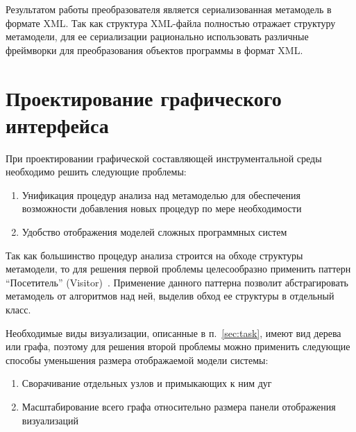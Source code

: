 Результатом работы преобразователя является сериализованная метамодель в формате
XML. Так как структура XML-файла полностью отражает структуру метамодели, для ее
сериализации рационально использовать различные фреймворки для преобразования
объектов программы в формат XML.

\section{Проектирование графического интерфейса}

При проектировании графической составляющей инструментальной среды необходимо
решить следующие проблемы:

\begin{enumerate}
    \item Унификация процедур анализа над метамоделью для обеспечения
    возможности добавления новых процедур по мере необходимости
    \item Удобство отображения моделей сложных программных систем
\end{enumerate}

Так как большинство процедур анализа строится на обходе структуры метамодели, то
для решения первой проблемы целесообразно применить паттерн ``Посетитель''
(Visitor)~\cite{Gamma94}. Применение данного паттерна позволит абстрагировать
метамодель от алгоритмов над ней, выделив обход ее структуры в отдельный класс.

Необходимые виды визуализации, описанные в п.~\ref{sec:task}, имеют вид дерева
или графа, поэтому для решения второй проблемы можно применить следующие способы
уменьшения размера отображаемой модели системы:

\begin{enumerate}
    \item Сворачивание отдельных узлов и примыкающих к ним дуг
    \item Масштабирование всего графа относительно размера панели отображения
    визуализаций
\end{enumerate}
